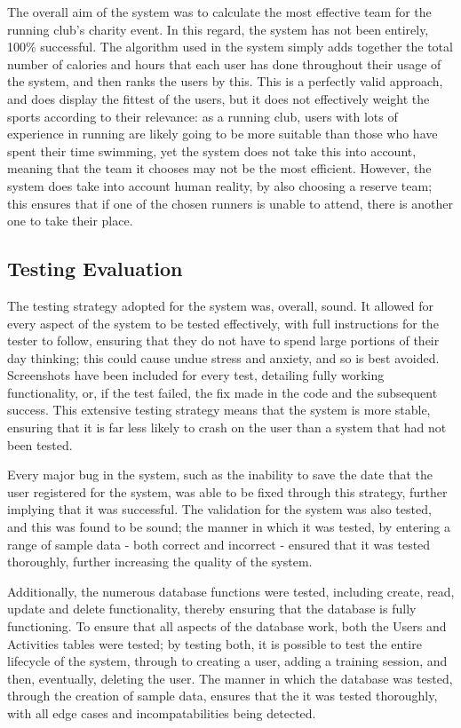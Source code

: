 \documentclass{article}[12pt,a4paper]
\begin{document}
{The overall aim of the system was to calculate the most effective team for the running club's charity event. In this regard, the system has not been entirely, 100\% successful. The algorithm used in the system simply adds together the total number of calories and hours that each user has done throughout their usage of the system, and then ranks the users by this. This is a perfectly valid approach, and does display the fittest of the users, but it does not effectively weight the sports according to their relevance: as a running club, users with lots of experience in running are likely going to be more suitable than those who have spent their time swimming, yet the system does not take this into account, meaning that the team it chooses may not be the most efficient. However, the system does take into account human reality, by also choosing a reserve team; this ensures that if one of the chosen runners is unable to attend, there is another one to take their place.

\subsection{Testing Evaluation}
The testing strategy adopted for the system was, overall, sound. It allowed for every aspect of the system to be tested effectively, with full instructions for the tester to follow, ensuring that they do not have to spend large portions of their day thinking; this could cause undue stress and anxiety, and so is best avoided. Screenshots have been included for every test, detailing fully working functionality, or, if the test failed, the fix made in the code and the subsequent success. This extensive testing strategy means that the system is more stable, ensuring that it is far less likely to crash on the user than a system that had not been tested.

Every major bug in the system, such as the inability to save the date that the user registered for the system, was able to be fixed through this strategy, further implying that it was successful. The validation for the system was also tested, and this was found to be sound; the manner in which it was tested, by entering a range of sample data - both correct and incorrect - ensured that it was tested thoroughly, further increasing the quality of the system.

Additionally, the numerous database functions were tested, including create, read, update and delete functionality, thereby ensuring that the database is fully functioning. To ensure that all aspects of the database work, both the Users and Activities tables were tested; by testing both, it is possible to test the entire lifecycle of the system, through to creating a user, adding a training session, and then, eventually, deleting the user. The manner in which the database was tested, through the creation of sample data, ensures that the it was tested thoroughly, with all edge cases and incompatabilities being detected.

}
\end{document}
